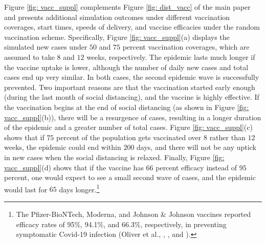 \documentclass[12pt]{article}
\begin{document}
Figure \ref{fig: vacc_suppl} complements Figure \ref{fig: dist_vacc} of the
main paper and presents additional simulation outcomes under different
vaccination coverages, start times, speeds of delivery, and vaccine efficacies
under the random vaccination scheme. Specifically, Figure
\ref{fig: vacc_suppl}(a) displays the simulated new cases under $50$ and $75$
percent vaccination coverages, which are assumed to take $8$ and $12$ weeks,
respectively. The epidemic lasts much longer if the vaccine uptake is lower,
although the number of daily new cases and total cases end up very similar. In
both cases, the second epidemic wave is successfully prevented. Two important
reasons are that the vaccination started early enough (during the last month
of social distancing), and the vaccine is highly effective. If the vaccination
begins at the end of social distancing (as shown in Figure
\ref{fig: vacc_suppl}(b)), there will be a resurgence of cases, resulting in a
longer duration of the epidemic and a greater number of total cases. Figure
\ref{fig: vacc_suppl}(c) shows that if $75$ percent of the population gets
vaccinated over $8$ rather than $12$ weeks, the epidemic could end within
$200$ days, and there will not be any uptick in new cases when the social
distancing is relaxed. Finally, Figure \ref{fig: vacc_suppl}(d) shows that if
the vaccine has $66$ percent efficacy instead of $95$ percent, one would
expect to see a small second wave of cases, and the epidemic would last for
$65$ days longer.\footnote{The Pfizer-BioNTech, Moderna, and Johnson \&
Johnson vaccines reported efficacy rates of 95\%, 94.1\%, and 66.3\%,
respectively, in preventing symptomatic Covid-19 infection (Oliver et al.,
\citeyear{Pfizer2020efficacy}%
,
\citeyear{Moderna2021efficacy}%
, and
\citeyear{Janssen2021efficacy}%
).}%
\end{document}

